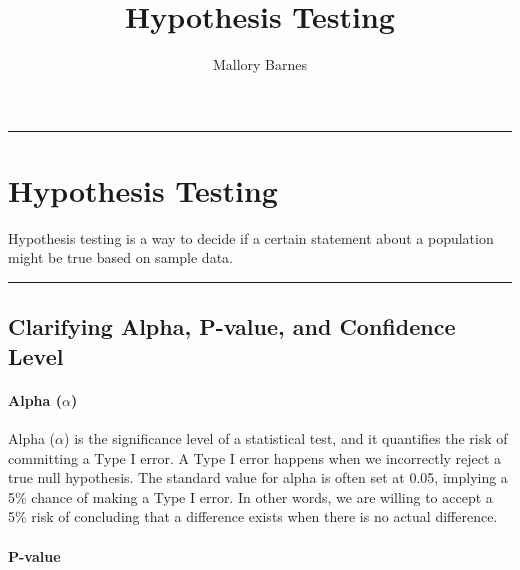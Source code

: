 \documentclass[
  letterpaper,
  DIV=11,
  numbers=noendperiod]{scrartcl}
\title{Hypothesis Testing}
\author{Mallory Barnes}
\date{}
\let\oldparagraph\paragraph
\renewcommand{\paragraph}[1]{\oldparagraph{#1}\mbox{}}
\begin{document}
\maketitle
\ifdefined\Shaded\renewenvironment{Shaded}{\begin{tcolorbox}[frame hidden, breakable, interior hidden, boxrule=0pt, borderline west={3pt}{0pt}{shadecolor}, sharp corners, enhanced]}{\end{tcolorbox}}\fi

\begin{center}\rule{0.5\linewidth}{0.5pt}\end{center}

\hypertarget{hypothesis-testing}{%
\section{Hypothesis Testing}\label{hypothesis-testing}}

Hypothesis testing is a way to decide if a certain statement about a
population might be true based on sample data.

\begin{center}\rule{0.5\linewidth}{0.5pt}\end{center}

\hypertarget{clarifying-alpha-p-value-and-confidence-level}{%
\subsection{Clarifying Alpha, P-value, and Confidence
Level}\label{clarifying-alpha-p-value-and-confidence-level}}

\hypertarget{alpha-alpha}{%
\paragraph{\texorpdfstring{Alpha
(\(\alpha\))}{Alpha (\textbackslash alpha)}}\label{alpha-alpha}}

Alpha (\(\alpha\)) is the significance level of a statistical test, and
it quantifies the risk of committing a Type I error. A Type I error
happens when we incorrectly reject a true null hypothesis. The standard
value for alpha is often set at 0.05, implying a 5\% chance of making a
Type I error. In other words, we are willing to accept a 5\% risk of
concluding that a difference exists when there is no actual difference.

\hypertarget{p-value}{%
\paragraph{P-value}\label{p-value}}
\end{document}
